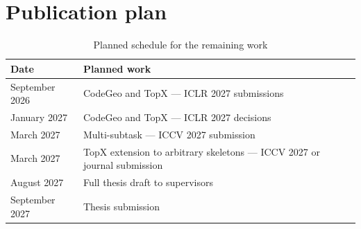 \documentclass[11pt,a4paper]{report}
\begin{document}
\section{Publication plan}

\begin{table}[h]
\centering\small
\begin{tabularx}{\textwidth}{@{}l X@{}}
\toprule
\textbf{Date} & \textbf{Planned work}\\
\midrule
September 2026 & CodeGeo and TopX --- ICLR 2027 submissions\\
January 2027   & CodeGeo and TopX --- ICLR 2027 decisions\\
March 2027     & Multi-subtask --- ICCV 2027 submission\\
March 2027     & TopX extension to arbitrary skeletons --- ICCV 2027 or journal
                 submission\\
August 2027    & Full thesis draft to supervisors\\
September 2027 & Thesis submission\\
\bottomrule
\end{tabularx}
\caption{Planned schedule for the remaining work}
\label{tab:schedule}
\end{table}



\end{document}
